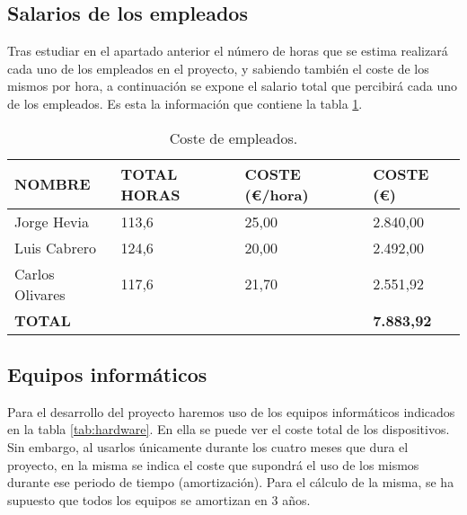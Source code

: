 \subsection{Salarios de los empleados}
\par Tras estudiar en el apartado anterior el número de horas que se estima realizará cada uno de los empleados en el proyecto, y sabiendo también el coste de los mismos por hora, a continuación se expone el salario total que percibirá cada uno de los empleados. Es esta la información que contiene la tabla \ref{tab:costePersonal}.

\begin{table}[H]
\begin{center}
\begin{tabular}{l l l l}
\textbf{NOMBRE} & \textbf{TOTAL HORAS} & \textbf{COSTE (\euro/hora)} & \textbf{COSTE (\euro)} \\ \hline \hline
Jorge Hevia & 113,6 & 25,00 & 2.840,00\\
Luis Cabrero & 124,6 & 20,00 & 2.492,00\\
Carlos Olivares & 117,6 & 21,70 & 2.551,92\\ \hline \hline
\textbf{TOTAL} & & & \textbf{7.883,92} \\ \hline
\end{tabular}
\caption{Coste de empleados.}
\label{tab:costePersonal}
\end{center}
\end{table}



\subsection{Equipos informáticos}
\par Para el desarrollo del proyecto haremos uso de los equipos informáticos indicados en la tabla \ref{tab:hardware}. En ella se puede ver el coste total de los dispositivos. Sin embargo, al usarlos únicamente durante los cuatro meses que dura el proyecto, en la misma se indica el coste que supondrá el uso de los mismos durante ese periodo de tiempo (amortización). Para el cálculo de la misma, se ha supuesto que todos los equipos se amortizan en 3 años.

